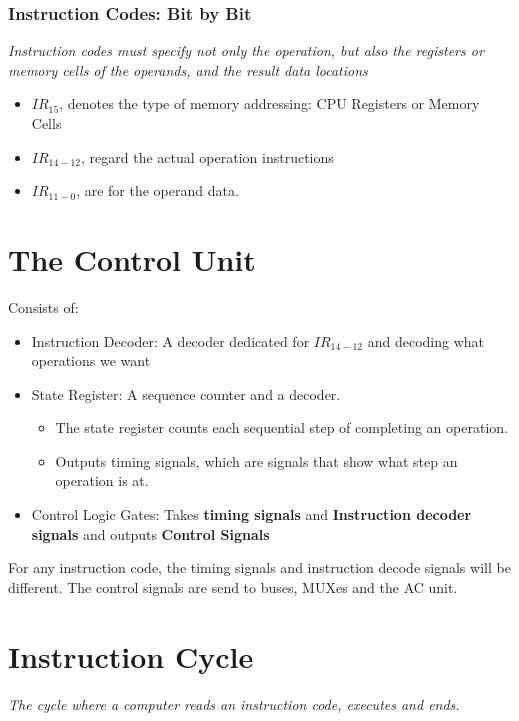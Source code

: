 \documentclass[11pt]{article}
\begin{document}
\subsubsection{Instruction Codes: Bit by Bit}
\textit{Instruction codes must specify not only the operation, but also the registers or memory cells of the operands, and the result data locations}

\begin{itemize}
  \item $IR_{15}$, denotes the type of memory addressing: CPU Registers or Memory Cells
  \item $IR_{14-12}$, regard the actual operation instructions
  \item $IR_{11-0}$, are for the operand data. 
\end{itemize}

\section{The Control Unit}
Consists of:
\begin{itemize}
  \item Instruction Decoder: A decoder dedicated for $IR_{14-12}$ and decoding what operations we want
  \item State Register: A sequence counter and a decoder. 
  \begin{itemize}
    \item The state register counts each sequential step of completing an operation. 
    \item Outputs timing signals, which are signals that show what step an operation is at.
  \end{itemize}
  \item Control Logic Gates: Takes \textbf{timing signals} and \textbf{Instruction decoder signals }and outputs \textbf{Control Signals}
\end{itemize}
For any instruction code, the timing signals and instruction decode signals will be different. The control signals are send to buses, MUXes and the AC unit. 

\section{Instruction Cycle}
\textit{The cycle where a computer reads an instruction code, executes and ends.}
\end{document}
